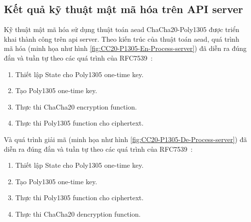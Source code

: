 \subsection{Kết quả kỹ thuật mật mã hóa trên API server}

Kỹ thuật mật mã hóa sử dụng thuật toán \acrshort{aead} ChaCha20-Poly1305 được triển khai thành công trên \acrshort{api} server. Theo kiến trúc của thuật toán \acrshort{aead}, quá trình mã hóa (minh họa như hình \ref{fig:CC20-P1305-En-Process-server}) đã diễn ra đúng đắn và tuần tự theo các quá trình của RFC7539~\cite{rfc7539}:

\begin{enumerate}
    \item Thiết lập State cho Poly1305 one-time key.
    \item Tạo Poly1305 one-time key.
    \item Thực thi ChaCha20 encryption function.
    \item Thực thi Poly1305 function cho ciphertext.
\end{enumerate}

Và quá trình giải mã (minh họa như hình \ref{fig:CC20-P1305-De-Process-server}) đã diễn ra đúng đắn và tuần tự theo các quá trình của RFC7539~\cite{rfc7539}:

\begin{enumerate}
    \item Thiết lập State cho Poly1305 one-time key.
    \item Tạo Poly1305 one-time key.
    \item Thực thi Poly1305 function cho ciphertext.
    \item Thực thi ChaCha20 dencryption function.
\end{enumerate}

